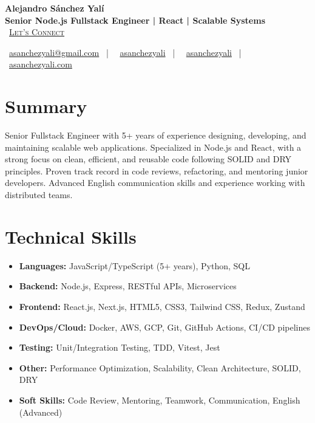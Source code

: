 \documentclass[letterpaper,11pt]{article}
\newcommand{\normalfaCalendar}{{\mdseries\faCalendar}}
\newcommand{\normalfaEnvelope}{{\mdseries\faEnvelope}}
\newcommand{\normalfaLinkedin}{{\mdseries\faLinkedin}}
\newcommand{\normalfaGithub}{{\mdseries\faGithub}}
\newcommand{\normalfaGlobe}{{\mdseries\faGlobe}}
\begin{document}
\begin{center}
\textbf{\Huge Alejandro Sánchez Yalí}\\[0.3em]
\textbf{\Large Senior Node.js Fullstack Engineer | React | Scalable Systems}\\[0.5em]
\small
\normalfaCalendar\ \href{https://cal.com/asanchezyali/full-time-opportunities}{\textsc{Let's Connect}}

\vspace{1em}
\normalfaEnvelope\ \href{mailto:asanchezyali@gmail.com}{asanchezyali@gmail.com}  ~|~
\normalfaLinkedin\ \href{https://www.linkedin.com/in/asanchezyali}{asanchezyali} ~|~
\normalfaGithub\ \href{https://github.com/asanchezyali}{asanchezyali}  ~|~
\normalfaGlobe\ \href{https://asanchezyali.com}{asanchezyali.com}
\end{center}

\section{Summary}
Senior Fullstack Engineer with 5+ years of experience designing, developing, and maintaining scalable web applications. Specialized in Node.js and React, with a strong focus on clean, efficient, and reusable code following SOLID and DRY principles. Proven track record in code reviews, refactoring, and mentoring junior developers. Advanced English communication skills and experience working with distributed teams.

\section{Technical Skills}
\begin{itemize}[leftmargin=*]
  \item \textbf{Languages:} JavaScript/TypeScript (5+ years), Python, SQL
  \item \textbf{Backend:} Node.js, Express, RESTful APIs, Microservices
  \item \textbf{Frontend:} React.js, Next.js, HTML5, CSS3, Tailwind CSS, Redux, Zustand
  \item \textbf{DevOps/Cloud:} Docker, AWS, GCP, Git, GitHub Actions, CI/CD pipelines
  \item \textbf{Testing:} Unit/Integration Testing, TDD, Vitest, Jest
  \item \textbf{Other:} Performance Optimization, Scalability, Clean Architecture, SOLID, DRY
  \item \textbf{Soft Skills:} Code Review, Mentoring, Teamwork, Communication, English (Advanced)
\end{itemize}
\end{document}
